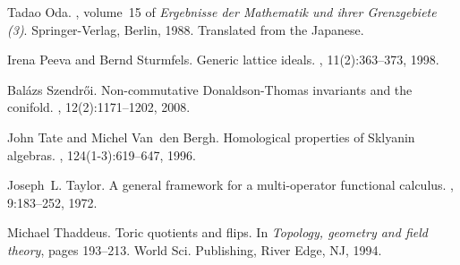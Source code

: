 \documentclass[11pt,a4paper]{amsart}
\numberwithin{equation}{section}
\theoremstyle{definition}
\theoremstyle{remark}
\begin{document}
\begin{thebibliography}{10}
Tadao Oda.
, volume~15 of {\em
  Ergebnisse der Mathematik und ihrer Grenzgebiete (3)}.
\newblock Springer-Verlag, Berlin, 1988.
\newblock Translated from the Japanese.

Irena Peeva and Bernd Sturmfels.
\newblock Generic lattice ideals.
, 11(2):363--373, 1998.

Bal{\'a}zs Szendr{\H{o}}i.
\newblock Non-commutative {D}onaldson-{T}homas invariants and the conifold.
, 12(2):1171--1202, 2008.

John Tate and Michel Van~den Bergh.
\newblock Homological properties of {S}klyanin algebras.
, 124(1-3):619--647, 1996.

Joseph~L. Taylor.
\newblock A general framework for a multi-operator functional calculus.
, 9:183--252, 1972.

Michael Thaddeus.
\newblock Toric quotients and flips.
\newblock In {\em Topology, geometry and field theory}, pages 193--213. World
  Sci. Publishing, River Edge, NJ, 1994.

\end{thebibliography}
\end{document}
